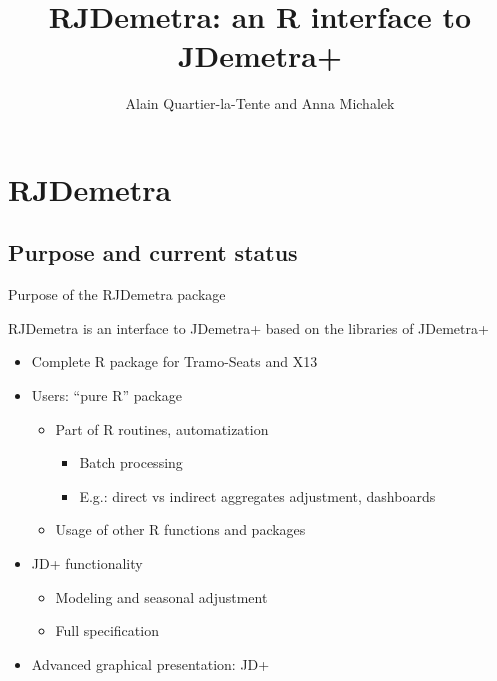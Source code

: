\documentclass[10pt,xcolor=table,color={dvipsnames,usenames},ignorenonframetext,usepdftitle=false,french]{beamer}
\title{RJDemetra: an R interface to JDemetra+}
\author{Alain Quartier-la-Tente and Anna Michalek}
\date{}
\providecommand{\tightlist}{%
  \setlength{\parskip}{0pt}
  }
\begin{document}
\begin{frame}
\titlepage
\end{frame}

\hypertarget{rjdemetra}{%
\section{RJDemetra}\label{rjdemetra}}

\hypertarget{purpose-and-current-status}{%
\subsection{Purpose and current
status}\label{purpose-and-current-status}}

\begin{frame}{Purpose of the RJDemetra package}
\protect\hypertarget{purpose-of-the-rjdemetra-package}{}

RJDemetra is an \large\faRProject{} \normalsize interface to JDemetra+
based on the \large\faJava{} \normalsize libraries of JDemetra+

\begin{itemize}
\tightlist
\item
  Complete R package for Tramo-Seats and X13\\
\item
  Users: ``pure R'' package

  \begin{itemize}
  \tightlist
  \item
    Part of R routines, automatization

    \begin{itemize}
    \tightlist
    \item
      Batch processing
    \item
      E.g.: direct vs indirect aggregates adjustment, dashboards
    \end{itemize}
  \item
    Usage of other R functions and packages
  \end{itemize}
\item
  JD+ functionality

  \begin{itemize}
  \tightlist
  \item
    Modeling and seasonal adjustment
  \item
    Full specification
  \end{itemize}
\item
  Advanced graphical presentation: JD+
\end{itemize}

\end{frame}
\end{document}
